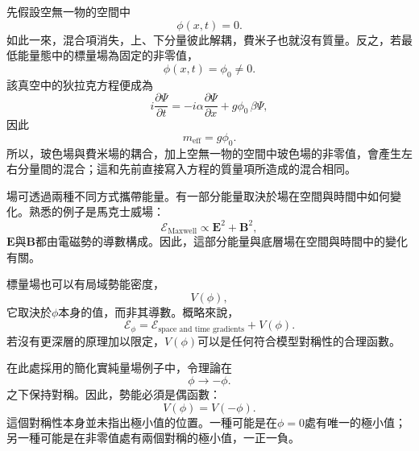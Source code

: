 先假設空無一物的空間中
\begin{equation}
\phi(x,t)=0.
\end{equation}
如此一來，混合項消失，上、下分量彼此解耦，費米子也就沒有質量。反之，若最低能量態中的標量場為固定的非零值，
\begin{equation}
\phi(x,t)=\phi_0\neq0.
\end{equation}
該真空中的狄拉克方程便成為
\begin{equation}
i\frac{\partial\Psi}{\partial t}
=
-i\alpha\frac{\partial\Psi}{\partial x}
+g\phi_0\,\beta\Psi,
\end{equation}
因此
\begin{equation}
m_{\mathrm{eff}}=g\phi_0.
\end{equation}
所以，玻色場與費米場的耦合，加上空無一物的空間中玻色場的非零值，會產生左右分量間的混合；這和先前直接寫入方程的質量項所造成的混合相同。

\begin{classroomqa}
\end{classroomqa}

\begin{classroomqa}
\end{classroomqa}

場可透過兩種不同方式攜帶能量。有一部分能量取決於場在空間與時間中如何變化。熟悉的例子是馬克士威場：
\begin{equation}
\mathcal{E}_{\mathrm{Maxwell}}\propto \mathbf E^2+\mathbf B^2,
\end{equation}
\(\mathbf E\)與\(\mathbf B\)都由電磁勢的導數構成。因此，這部分能量與底層場在空間與時間中的變化有關。

標量場也可以有局域勢能密度，
\begin{equation}
V(\phi),
\end{equation}
它取決於\(\phi\)本身的值，而非其導數。概略來說，
\begin{equation}
\mathcal{E}_\phi
=
\mathcal E_{\text{space and time gradients}}+V(\phi).
\end{equation}
若沒有更深層的原理加以限定，\(V(\phi)\)可以是任何符合模型對稱性的合理函數。

在此處採用的簡化實純量場例子中，令理論在
\begin{equation}
\phi\longrightarrow-\phi.
\end{equation}
之下保持對稱。因此，勢能必須是偶函數：
\begin{equation}
V(\phi)=V(-\phi).
\end{equation}
這個對稱性本身並未指出極小值的位置。一種可能是在\(\phi=0\)處有唯一的極小值；另一種可能是在非零值處有兩個對稱的極小值，一正一負。

